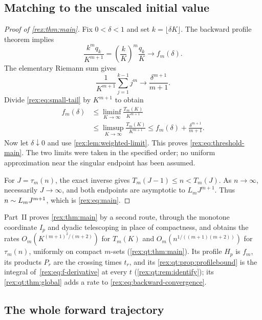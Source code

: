 \subsection{Matching to the unscaled initial value}

\begin{proof}[Proof of \cref{rex:thm:main}]
Fix $0<\delta<1$ and set $k=\lfloor\delta K\rfloor$. The backward
profile theorem implies
\[
 \frac{k^m q_k}{K^{m+1}}
 =\left(\frac kK\right)^m\frac{q_k}{K}
 \longrightarrow f_m(\delta).
\]
The elementary Riemann sum gives
\[
 \frac1{K^{m+1}}\sum_{j=1}^{k-1}j^m
 \longrightarrow\frac{\delta^{m+1}}{m+1}.
\]
Divide \cref{rex:eq:small-tail} by $K^{m+1}$ to obtain
\begin{align*}
 f_m(\delta)
 &\leq\liminf_{K\to\infty}\frac{T_m(K)}{K^{m+1}}\\
 &\leq\limsup_{K\to\infty}\frac{T_m(K)}{K^{m+1}}
 \leq f_m(\delta)+\frac{\delta^{m+1}}{m+1}.
\end{align*}
Now let $\delta\downarrow0$ and use \cref{rex:lem:weighted-limit}. This
proves \cref{rex:eq:threshold-main}. The two limits were taken in the
specified order; no uniform approximation near the singular endpoint
has been assumed.

For $J=\tau_m(n)$, the exact inverse gives
$T_m(J-1)\leq n<T_m(J)$. As $n\to\infty$, necessarily $J\to\infty$,
and both endpoints are asymptotic to $L_mJ^{m+1}$. Thus
$n\mathrel{\sim} L_mJ^{m+1}$, which is \cref{rex:eq:main}.
\end{proof}

\begin{writenote}
Part~II proves \cref{rex:thm:main} by a second route, through the monotone
coordinate $I_p$ and dyadic telescoping in place of compactness, and obtains
the rates $O_m(K^{(m+1)^2/(m+2)})$ for $T_m(K)$ and
$O_m(n^{1/((m+1)(m+2))})$ for $\tau_m(n)$, uniformly on compact $m$-sets
(\cref{rex:qt:thm:main}). Its profile $H_p$ is $f_m$, its products $P_r$ are
the crossing times $t_r$, and its \cref{rex:qt:prop:profilebound} is the
integral of~\eqref{rex:eq:f-derivative} at every $t$
(\cref{rex:qt:rem:identify}); its \cref{rex:qt:thm:global} adds a rate to
\eqref{rex:eq:backward-convergence}.
\end{writenote}

\subsection{The whole forward trajectory}


